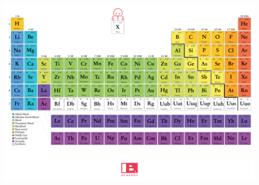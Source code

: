     \clearpage
    \begin{center}
    \includegraphics[height=\linewidth,angle=90]{./FullPages/TPE.pdf}
    \end{center}


    
    
    
    
    
    


    
    
    


